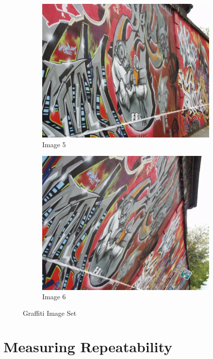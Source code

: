 \documentclass[12pt]{article}
\begin{document}
\begin{figure}[H]
\begin{subfigure}{0.45\textwidth}
        \includegraphics[height=0.75\textwidth]{images/img5.png}
        \caption{Image 5}
        \label{graffiti-5}
    \end{subfigure}
    \begin{subfigure}{0.45\textwidth}
        \centering
        \includegraphics[height=0.75\textwidth]{images/img6.png}
        \caption{Image 6}
        \label{graffiti-6}
    \end{subfigure}
    \caption{Graffiti Image Set}
    \label{fig:graffiti}
\end{figure}

\section{Measuring Repeatability}
\end{document}
